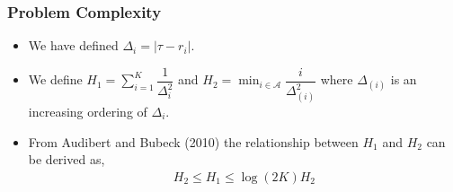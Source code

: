 \begin{frame}
\frametitle{Problem Complexity}
\begin{itemize}
\item<1-> We have defined $\Delta_i= |\tau - r_i |$.
\item<2-> We define $H_{1} = \sum_{i=1}^{K}\dfrac{1}{\Delta_{i}^{2}}$ and $
H_{2} =\min_{i\in \mathcal{A}}\dfrac{i}{{\Delta_{(i)}^{2}}} $ where $\Delta_{(i)}$ is an increasing ordering of ${\Delta}_{i}$.
%
\item<3-> From {Audibert and Bubeck (2010)} the relationship between $H_1$ and $H_2$ can be derived as,
\begin{align*}
H_{2} \leq H_{1}\leq \log(2K)H_{2} 
\end{align*}
\end{itemize}
\end{frame}

